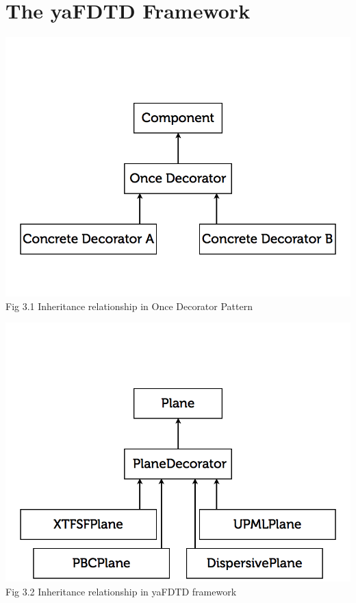 \documentclass[openany]{book}
\begin{document}
\chapter{The yaFDTD Framework}








\clearpage
\begin{center}
\includegraphics[scale=0.5]{images/once-decorator.jpg}\\
Fig 3.1
Inheritance relationship in Once Decorator Pattern
\end{center}
\begin{center}
\includegraphics[scale=0.5]{images/once-decorator-yafdtd.png}\\
Fig 3.2
Inheritance relationship in yaFDTD framework
\end{center}
\end{document}
